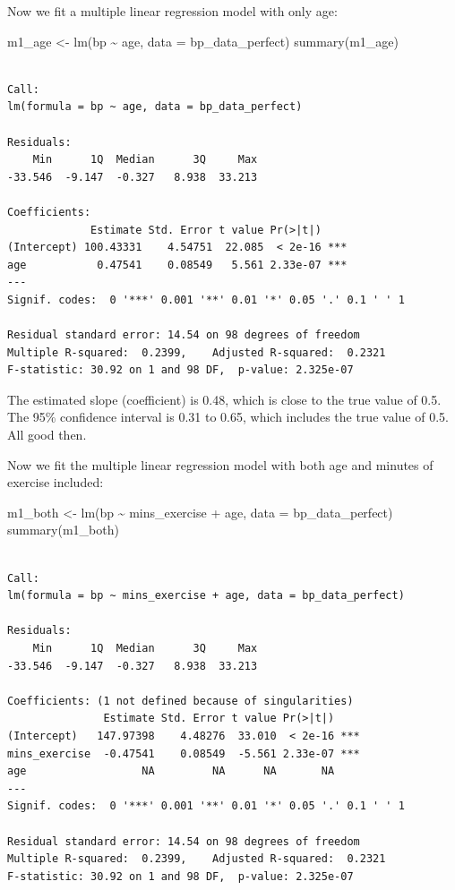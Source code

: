 \documentclass[
  letterpaper,
  8pt,
  a4paper]{book}
\newenvironment{Shaded}{\begin{snugshade}}{\end{snugshade}}
\newcommand{\AttributeTok}[1]{\textcolor[rgb]{0.40,0.45,0.13}{#1}}
\newcommand{\FunctionTok}[1]{\textcolor[rgb]{0.28,0.35,0.67}{#1}}
\newcommand{\NormalTok}[1]{\textcolor[rgb]{0.00,0.23,0.31}{#1}}
\newcommand{\OtherTok}[1]{\textcolor[rgb]{0.00,0.23,0.31}{#1}}
\newcommand{\SpecialCharTok}[1]{\textcolor[rgb]{0.37,0.37,0.37}{#1}}
\begin{document}
Now we fit a multiple linear regression model with only age:

\begin{Shaded}
\begin{Highlighting}[]
\NormalTok{m1\_age }\OtherTok{\textless{}{-}} \FunctionTok{lm}\NormalTok{(bp }\SpecialCharTok{\textasciitilde{}}\NormalTok{ age, }\AttributeTok{data =}\NormalTok{ bp\_data\_perfect)}
\FunctionTok{summary}\NormalTok{(m1\_age)}
\end{Highlighting}
\end{Shaded}

\begin{verbatim}

Call:
lm(formula = bp ~ age, data = bp_data_perfect)

Residuals:
    Min      1Q  Median      3Q     Max 
-33.546  -9.147  -0.327   8.938  33.213 

Coefficients:
             Estimate Std. Error t value Pr(>|t|)    
(Intercept) 100.43331    4.54751  22.085  < 2e-16 ***
age           0.47541    0.08549   5.561 2.33e-07 ***
---
Signif. codes:  0 '***' 0.001 '**' 0.01 '*' 0.05 '.' 0.1 ' ' 1

Residual standard error: 14.54 on 98 degrees of freedom
Multiple R-squared:  0.2399,    Adjusted R-squared:  0.2321 
F-statistic: 30.92 on 1 and 98 DF,  p-value: 2.325e-07
\end{verbatim}

The estimated slope (coefficient) is 0.48, which is close to the true
value of 0.5. The 95\% confidence interval is 0.31 to 0.65, which
includes the true value of 0.5. All good then.

Now we fit the multiple linear regression model with both age and
minutes of exercise included:

\begin{Shaded}
\begin{Highlighting}[]
\NormalTok{m1\_both }\OtherTok{\textless{}{-}} \FunctionTok{lm}\NormalTok{(bp }\SpecialCharTok{\textasciitilde{}}\NormalTok{ mins\_exercise }\SpecialCharTok{+}\NormalTok{ age, }\AttributeTok{data =}\NormalTok{ bp\_data\_perfect)}
\FunctionTok{summary}\NormalTok{(m1\_both)}
\end{Highlighting}
\end{Shaded}

\begin{verbatim}

Call:
lm(formula = bp ~ mins_exercise + age, data = bp_data_perfect)

Residuals:
    Min      1Q  Median      3Q     Max 
-33.546  -9.147  -0.327   8.938  33.213 

Coefficients: (1 not defined because of singularities)
               Estimate Std. Error t value Pr(>|t|)    
(Intercept)   147.97398    4.48276  33.010  < 2e-16 ***
mins_exercise  -0.47541    0.08549  -5.561 2.33e-07 ***
age                  NA         NA      NA       NA    
---
Signif. codes:  0 '***' 0.001 '**' 0.01 '*' 0.05 '.' 0.1 ' ' 1

Residual standard error: 14.54 on 98 degrees of freedom
Multiple R-squared:  0.2399,    Adjusted R-squared:  0.2321 
F-statistic: 30.92 on 1 and 98 DF,  p-value: 2.325e-07
\end{verbatim}
\end{document}
